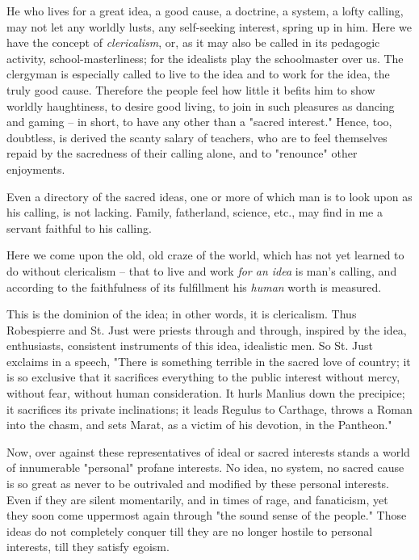 He who lives for a great idea, a good cause, a doctrine, a system, a lofty 
calling, may not let any worldly lusts, any self-seeking interest, spring up 
in him. Here we have the concept of \textit{clericalism}, or, as it may also 
be called in its pedagogic activity, school-masterliness; for the idealists 
play the schoolmaster over us. The clergyman is especially called to live to 
the idea and to work for the idea, the truly good cause. Therefore the people 
feel how little it befits him to show worldly haughtiness, to desire good 
living, to join in such pleasures as dancing and gaming -- in short, to have 
any other than a "{}sacred interest."{} Hence, too, doubtless, is derived the 
scanty salary of teachers, who are to feel themselves repaid by the sacredness 
of their calling alone, and to "{}renounce"{} other enjoyments.

Even a directory of the sacred ideas, one or more of which man is to look upon 
as his calling, is not lacking. Family, fatherland, science, etc., may find in 
me a servant faithful to his calling.

Here we come upon the old, old craze of the world, which has not yet learned 
to do without clericalism -- that to live and work \textit{for an idea} is 
man's calling, and according to the faithfulness of its fulfillment his 
\textit{human} worth is measured.

This is the dominion of the idea; in other words, it is clericalism. Thus 
Robespierre and St. Just were priests through and through, inspired by the 
idea, enthusiasts, consistent instruments of this idea, idealistic men. So St. 
Just exclaims in a speech, "{}There is something terrible in the sacred love 
of country; it is so exclusive that it sacrifices everything to the public 
interest without mercy, without fear, without human consideration. It hurls 
Manlius down the precipice; it sacrifices its private inclinations; it leads 
Regulus to Carthage, throws a Roman into the chasm, and sets Marat, as a 
victim of his devotion, in the Pantheon."{}

Now, over against these representatives of ideal or sacred interests stands a 
world of innumerable "{}personal"{} profane interests. No idea, no system, no 
sacred cause is so great as never to be outrivaled and modified by these 
personal interests. Even if they are silent momentarily, and in times of rage, 
and fanaticism, yet they soon come uppermost again through "{}the sound sense 
of the people."{} Those ideas do not completely conquer till they are no 
longer hostile to personal interests, till they satisfy egoism.

